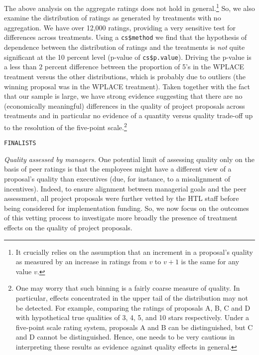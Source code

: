 \documentclass[12pt, titlepage]{article}
\begin{document}
The above analysis on the aggregate ratings does not hold in
general.\footnote{It crucially relies on the assumption that an
  increment in a proposal's quality as measured by an increase in
  ratings from \(v\) to \(v+1\) is the same for any value \(v\).} So, we
also examine the distribution of ratings as generated by treatments with
no aggregation. We have over 12,000 ratings, providing a very sensitive
test for differences across treatments. Using a \texttt{cs\$method} we
find that the hypothesis of dependence between the distribution of
ratings and the treatments is \emph{not} quite significant at the 10
percent level (p-value of \texttt{cs\$p.value}). Driving the p-value is
a less than \(2\) percent difference between the proportion of 5's in
the WPLACE treatment versus the other distributions, which is probably
due to outliers (the winning proposal was in the WPLACE treatment).
Taken together with the fact that our sample is large, we have strong
evidence suggesting that there are no (economically meaningful)
differences in the quality of project proposals across treatments and in
particular no evidence of a quantity versus quality trade-off up to the
resolution of the five-point scale.\footnote{One may worry that such
  binning is a fairly coarse measure of quality. In particular, effects
  concentrated in the upper tail of the distribution may not be
  detected. For example, comparing the ratings of proposals A, B, C and
  D with hypothetical true qualities of 3, 4, 5, and 10 stars
  respectively. Under a five-point scale rating system, proposals A and
  B can be distinguished, but C and D cannot be distinguished. Hence,
  one needs to be very cautious in interpreting these results as
  evidence against quality effects in general.}

\begin{verbatim}
FINALISTS 
\end{verbatim}

\emph{Quality assessed by managers.} One potential limit of assessing
quality only on the basis of peer ratings is that the employees might
have a different view of a proposal's quality than executives (due, for
instance, to a misalignment of incentives). Indeed, to ensure alignment
between managerial goals and the peer assessment, all project proposals
were further vetted by the HTL staff before being considered for
implementation funding. So, we now focus on the outcomes of this vetting
process to investigate more broadly the presence of treatment effects on
the quality of project proposals.
\end{document}
